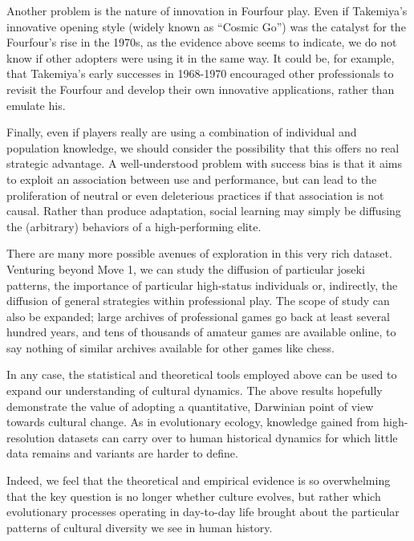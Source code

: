 \documentclass{article}
\begin{document}
Another problem is the nature of innovation in Fourfour play.  Even if Takemiya's innovative opening style (widely known as ``Cosmic Go'') was the catalyst for the Fourfour's rise in the 1970s, as the evidence above seems to indicate, we do not know if other adopters were using it in the same way.  It could be, for example, that Takemiya's early successes in 1968-1970 encouraged other professionals to revisit the Fourfour and develop their own innovative applications, rather than emulate his.  

Finally, even if players really are using a combination of individual and population knowledge, we should consider the possibility that this offers no real strategic advantage.  A well-understood problem with success bias is that it aims to exploit an association between use and performance, but can lead to the proliferation of neutral or even deleterious practices if that association is not causal.  Rather than produce adaptation, social learning may simply be diffusing the (arbitrary) behaviors of a high-performing elite.

There are many more possible avenues of exploration in this very rich dataset.  Venturing beyond Move 1, we can study the diffusion of particular joseki patterns, the importance of particular high-status individuals or, indirectly, the diffusion of general strategies within professional play.  The scope of study can also be expanded; large archives of professional games go back at least several hundred years, and tens of thousands of amateur games are available online, to say nothing of similar archives available for other games like chess.  

In any case, the statistical and theoretical tools employed above can be used to expand our understanding of cultural dynamics.  The above results hopefully demonstrate the value of adopting a quantitative, Darwinian point of view towards cultural change.  As in evolutionary ecology, knowledge gained from high-resolution datasets can carry over to human historical dynamics for which little data remains and variants are harder to define.  

Indeed, we feel that the theoretical and empirical evidence is so overwhelming that the key question is no longer whether culture evolves, but rather which evolutionary processes operating in day-to-day life brought about the particular patterns of cultural diversity we see in human history.  
\end{document}
